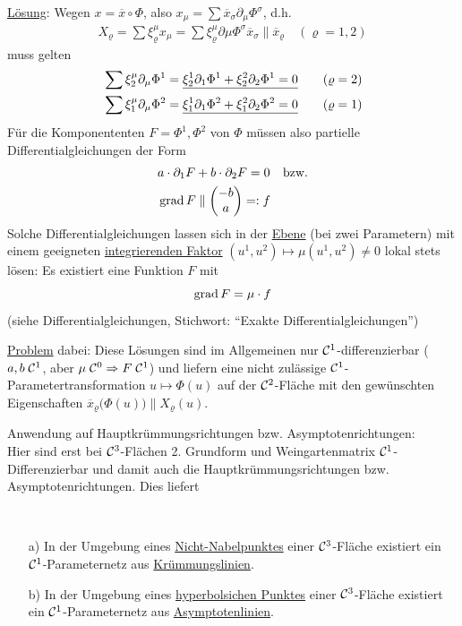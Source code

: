 \uline{Lösung}: Wegen \(x = \overline x \circ \Phi\), also \( x_\mu = \sum \overline x_\sigma \partial_\mu \Phi^\sigma\), d.h.
\begin{align*}
 X_\varrho = \sum \xi^\mu_\varrho x_\mu = \sum \xi^\mu_\varrho \partial \mu \Phi^\sigma \overline x_\sigma \parallel \overline x_\varrho \quad (\varrho = 1,2)
\end{align*}
muss gelten
\begin{align*}
  &\sum \xi^\mu_2 \partial_\mu \Phi^1 = \uline{\xi^1_2 \partial_1 \Phi^1 + \xi^2_2 \partial_2 \Phi^1 = 0} \tag{\(\varrho = 2\)} \\
  &\sum \xi^\mu_1 \partial_\mu \Phi^2 = \uline{\xi^1_1 \partial_1 \Phi^2 + \xi^2_1 \partial_2 \Phi^2 = 0} \tag{\(\varrho = 1\)} 
\end{align*}
Für die Komponententen \(F = \Phi^1, \Phi^2\) von \(\Phi\) müssen also partielle Differentialgleichungen der Form
\begin{align*}
 &a \cdot \partial_1 F + b \cdot \partial_2 F = 0 &\text{bzw.} \\
 &\operatorname{grad} F \parallel \begin{pmatrix} -b \\ a \end{pmatrix}  =: f
\end{align*}
Solche Differentialgleichungen lassen sich in der \uline{Ebene} (bei zwei Parametern) mit einem geeigneten \uline{integrierenden Faktor} \((u^1, u^2) \mapsto \mu(u^1, u^2) \ne 0\) lokal stets lösen: Es existiert eine Funktion \(F\) mit 
\[
 \operatorname{grad} F = \mu \cdot f
\]
(siehe Differentialgleichungen, Stichwort: ``Exakte Differentialgleichungen'') \par
\uline{Problem} dabei: Diese Lösungen sind im Allgemeinen nur \(\mathcal{C}^1\)-differenzierbar (\(a,b \; \mathcal{C}^1\), aber \(\mu \; \mathcal{C}^0 \Rightarrow F \; \mathcal{C}^1\)) und liefern eine nicht zulässige \(\mathcal{C}^1\)-Parametertransformation \(u \mapsto \Phi(u)\) auf der \(\mathcal{C}^2\)-Fläche mit den gewünschten Eigenschaften \(\overline x_\varrho \big(\Phi(u)\big) \parallel X_\varrho(u)\). \par

Anwendung auf Hauptkrümmungsrichtungen bzw. Asymptotenrichtungen:\\
Hier sind erst bei \(\mathcal{C}^3\)-Flächen 2. Grundform und Weingartenmatrix \(\mathcal{C}^1\)-Differenzierbar und damit auch die Hauptkrümmungsrichtungen bzw. Asymptotenrichtungen. Dies liefert

\begin{satz}\label{satz247} \(\)
 \begin{enumerate}
  \item[a)] In der Umgebung eines \uline{Nicht-Nabelpunktes} einer \(\mathcal{C}^3\)-Fläche existiert ein \(\mathcal{C}^1\)-Parameternetz aus \uline{Krümmungslinien}.  
  \item[b)] In der Umgebung eines \uline{hyperbolsichen Punktes}  einer \(\mathcal{C}^3\)-Fläche existiert ein \(\mathcal{C}^1\)-Parameternetz aus \uline{Asymptotenlinien}.
 \end{enumerate}

\end{satz}

